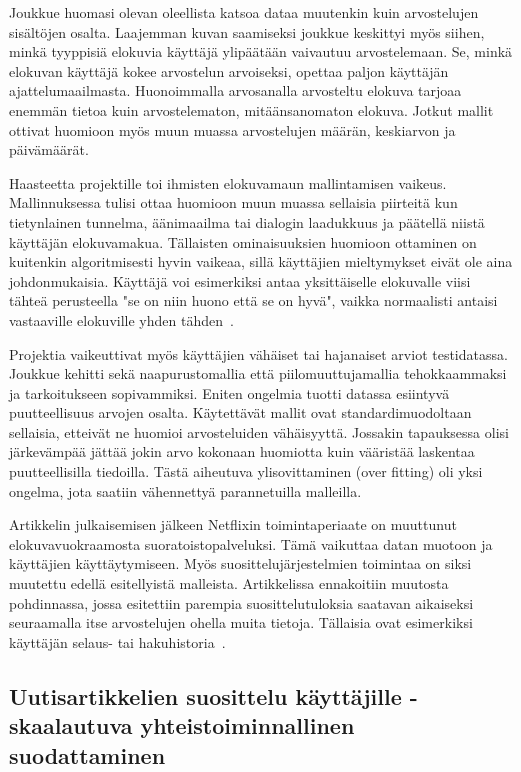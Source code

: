 \documentclass[12pt,finnish]{tktltiki2}
\theoremstyle{definition}
\theoremstyle{remark}
\begin{document}
        Joukkue huomasi olevan oleellista katsoa dataa muutenkin kuin arvostelujen sisältöjen osalta. Laajemman kuvan saamiseksi joukkue keskittyi myös siihen, minkä tyyppisiä elokuvia käyttäjä ylipäätään vaivautuu arvostelemaan. Se, minkä elokuvan käyttäjä kokee arvostelun arvoiseksi, opettaa paljon käyttäjän ajattelumaailmasta. Huonoimmalla arvosanalla arvosteltu elokuva tarjoaa enemmän tietoa kuin arvostelematon, mitäänsanomaton elokuva. Jotkut mallit ottivat huomioon myös muun muassa arvostelujen määrän, keskiarvon ja päivämäärät.
        
Haasteetta projektille toi ihmisten elokuvamaun mallintamisen vaikeus. Mallinnuksessa tulisi ottaa huomioon muun muassa sellaisia piirteitä kun tietynlainen tunnelma, äänimaailma tai dialogin laadukkuus ja päätellä niistä käyttäjän elokuvamakua. Tällaisten ominaisuuksien huomioon ottaminen on kuitenkin algoritmisesti hyvin vaikeaa, sillä käyttäjien mieltymykset eivät ole aina johdonmukaisia. Käyttäjä voi esimerkiksi antaa yksittäiselle elokuvalle viisi tähteä perusteella "se on niin huono että se on hyvä", vaikka normaalisti antaisi vastaaville elokuville yhden tähden~\cite{Bell:2007:LNP:1345448.1345465}.
        
        Projektia vaikeuttivat myös käyttäjien vähäiset tai hajanaiset arviot testidatassa. Joukkue kehitti sekä naapurustomallia että piilomuuttujamallia tehokkaammaksi ja tarkoitukseen sopivammiksi. Eniten ongelmia tuotti datassa esiintyvä puutteellisuus arvojen osalta. Käytettävät mallit ovat standardimuodoltaan sellaisia, etteivät ne huomioi arvosteluiden vähäisyyttä. Jossakin tapauksessa olisi järkevämpää jättää jokin arvo kokonaan huomiotta kuin vääristää laskentaa puutteellisilla tiedoilla. Tästä aiheutuva ylisovittaminen (over fitting) oli yksi ongelma, jota saatiin vähennettyä parannetuilla malleilla.
        
Artikkelin julkaisemisen jälkeen Netflixin toimintaperiaate on muuttunut elokuvavuokraamosta suoratoistopalveluksi. Tämä vaikuttaa datan muotoon ja käyttäjien käyttäytymiseen. Myös suosittelujärjestelmien toimintaa on siksi muutettu edellä esitellyistä malleista. Artikkelissa ennakoitiin muutosta pohdinnassa, jossa esitettiin parempia suosittelutuloksia saatavan aikaiseksi seuraamalla itse arvostelujen ohella muita tietoja. Tällaisia ovat esimerkiksi käyttäjän selaus- tai hakuhistoria~\cite{Bell:2007:LNP:1345448.1345465}.

\subsection{Uutisartikkelien suosittelu käyttäjille - skaalautuva yhteistoiminnallinen suodattaminen}
\end{document}

